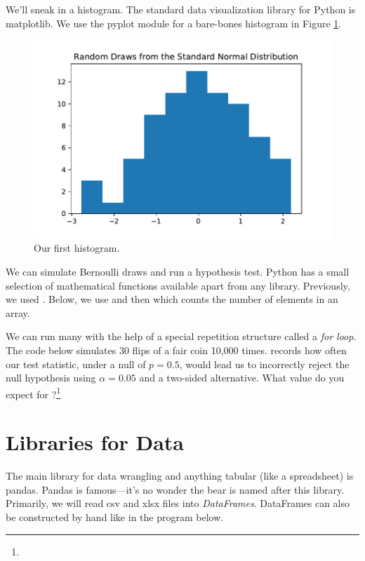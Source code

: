 \documentclass{article}
\begin{document}
\noindent We'll sneak in a histogram. The standard data visualization library for Python is matplotlib. We use the pyplot module for a bare-bones histogram in Figure \ref{fig:hist}.



\begin{figure}
    \centering
    \includegraphics[width = .59\textwidth]{figures/first_histogram.pdf}
    \caption{Our first histogram.}
    \label{fig:hist}
\end{figure}

We can simulate Bernoulli draws and run a hypothesis test. Python has a small selection of mathematical functions available apart from any library. Previously, we used . Below, we use  and then  which counts the number of elements in  an array.


\noindent We can run many with the help of a special repetition structure called a \emph{for loop}. The code below simulates 30 flips of a fair coin 10,000 times.  records how often our test statistic, under a null of $p= 0.5$, would lead us to incorrectly reject the null hypothesis using $\alpha = 0.05$ and a two-sided alternative. What value do you expect for ?\footnote{}




\section{Libraries for Data}

The main library for data wrangling and anything tabular (like a spreadsheet) is pandas. Pandas is famous---it's no wonder the bear is named after this library. Primarily, we will read csv and xlsx files into \emph{DataFrames}. DataFrames can also be constructed by hand like in the program below.
\end{document}
